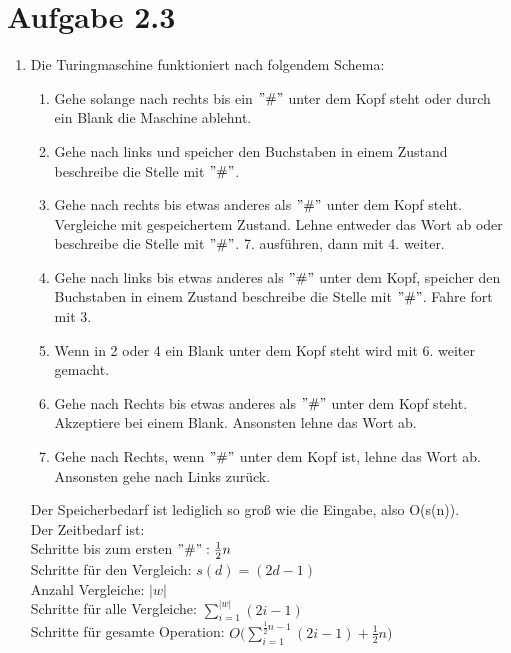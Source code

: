 \documentclass{article}
\begin{document}
	\section[a 2.3]{Aufgabe 2.3}
	\begin{enumerate} [label=\alph*.]
		\item Die Turingmaschine funktioniert nach folgendem Schema:\\
		\begin{enumerate}[label=\arabic*.]
			\item Gehe solange nach rechts bis ein $"\#"$ unter dem Kopf steht oder durch ein Blank die Maschine ablehnt.
			\item Gehe nach links und speicher den Buchstaben in einem Zustand beschreibe die Stelle mit $"\#"$.
			\item Gehe nach rechts bis etwas anderes als $"\#"$ unter dem Kopf steht. Vergleiche mit gespeichertem Zustand. Lehne entweder das Wort ab oder beschreibe die Stelle mit $"\#"$. 7. ausführen, dann mit 4. weiter.
			\item Gehe nach links bis etwas anderes als $"\#"$ unter dem Kopf, speicher den Buchstaben in einem Zustand beschreibe die Stelle mit $"\#"$. Fahre fort mit 3.
			\item Wenn in 2 oder 4 ein Blank unter dem Kopf steht wird mit 6. weiter gemacht.
			\item Gehe nach Rechts bis etwas anderes als $"\#"$ unter dem Kopf steht. Akzeptiere bei einem Blank. Ansonsten lehne das Wort ab.
			\item Gehe nach Rechts, wenn $"\#"$ unter dem Kopf ist, lehne das Wort ab. Ansonsten gehe nach Links zurück.
			\end{enumerate}
		Der Speicherbedarf ist lediglich so groß wie die Eingabe, also O(s(n)).\\
		Der Zeitbedarf ist:\\ Schritte bis zum ersten $"\#":\frac{1}{2}n$\\
		Schritte für den Vergleich: $s(d) = (2d-1)$\\
		Anzahl Vergleiche: $|w|$\\
		Schritte für alle Vergleiche: $\sum_{i=1}^{|w|}(2i-1)$\\
		Schritte für gesamte Operation:  $O\Big(\sum_{i=1}^{\frac{1}{2}n-1}(2i-1)+\frac{1}{2}n\Big)$
	\end{enumerate}
\end{document}
